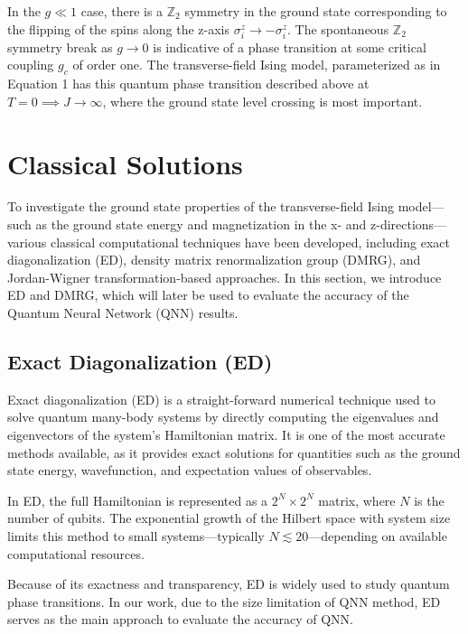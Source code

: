 \documentclass[a4paper]{article}
\begin{document}
In the $g\ll1$ case, there is a $\mathbb{Z}_2$ symmetry in the ground state corresponding to the flipping of the spins along the z-axis $\sigma_i^z\to-\sigma_i^z$. The spontaneous $\mathbb{Z}_2$ symmetry break as $g\to0$ is indicative of a phase transition at some critical
coupling $g_c$ of order one. The transverse-field Ising model, parameterized as in Equation 1 has this quantum phase
transition described above at $T=0\implies J\to\infty$, where the ground state level crossing is most important.





\section{Classical Solutions}
To investigate the ground state properties of the transverse-field Ising model—such as the ground state energy and magnetization in the x- and z-directions—various classical computational techniques have been developed, including exact diagonalization (ED), density matrix renormalization group (DMRG), and Jordan-Wigner transformation-based approaches. In this section, we introduce ED and DMRG, which will later be used to evaluate the accuracy of the Quantum Neural Network (QNN) results. 
\subsection{Exact Diagonalization (ED)}
Exact diagonalization (ED) is a straight-forward numerical technique used to solve quantum many-body systems by directly computing the eigenvalues and eigenvectors of the system's Hamiltonian matrix. It is one of the most accurate methods available, as it provides exact solutions for quantities such as the ground state energy, wavefunction, and expectation values of observables.

In ED, the full Hamiltonian is represented as a $2^N \times 2^N$ matrix, where $N$ is the number of qubits. The exponential growth of the Hilbert space with system size limits this method to small systems---typically $N \lesssim 20$---depending on available computational resources.

Because of its exactness and transparency, ED is widely used to study quantum phase transitions. In our work, due to the size limitation of QNN method, ED serves as the main approach to evaluate the accuracy of QNN.
\end{document}

